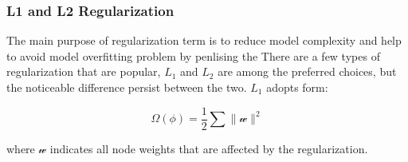\subsubsection{L1 and L2 Regularization}

The main purpose of regularization term is to reduce model complexity and help to avoid model overfitting problem by penlising the  There are a few types of regularization that are popular, $L_1$ and $L_2$ are among the preferred choices, but the noticeable difference persist between the two. $L_1$ adopts form:

\begin{equation}
   \Omega(\phi) = \frac {1}{2} \sum \parallel \mathcal{w} \parallel^2
\end{equation}

where $\mathcal{w}$ indicates all node weights that are affected by the regularization. 
